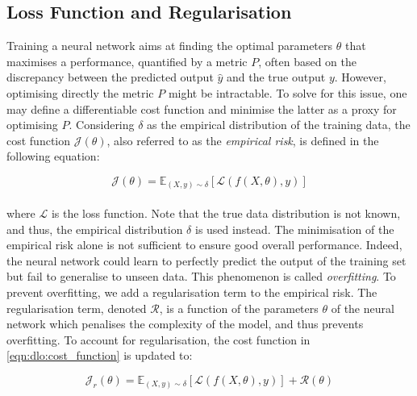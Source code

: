 
\subsection{Loss Function and Regularisation}
Training a neural network aims at finding the optimal parameters $\theta$ that
maximises a performance, quantified by a metric $P$, often based on the
discrepancy between the predicted output $\hat{y}$ and the true output $y$.
However, optimising directly the metric $P$ might be intractable. To solve for
this issue, one may define a differentiable cost function and minimise the
latter as a proxy for optimising $P$. Considering $\delta$ as the empirical
distribution of the training data, the cost function $\mathcal{J}(\theta)$, also
referred to as the \emph{empirical risk}, is defined in the following equation:

\begin{equation}
  \label{eqn:dlo:cost_function}
  \mathcal{J}(\theta) = \mathds{E}_{(X, y) \sim \delta} \left[ \mathcal{L}(f(X,\theta), y) \right]
\end{equation}\\

\noindent where $\mathcal{L}$ is the loss function. Note that the true data
distribution is not known, and thus, the empirical distribution $\delta$ is used
instead. The minimisation of the empirical risk alone is not sufficient to
ensure good overall performance. Indeed, the neural network could learn to
perfectly predict the output of the training set but fail to generalise to
unseen data. This phenomenon is called \emph{overfitting}. To prevent
overfitting, we add a regularisation term to the empirical risk. The
regularisation term, denoted $\mathcal{R}$, is a function of the parameters
$\theta$ of the neural network which penalises the complexity of the model, and
thus prevents overfitting. To account for regularisation, the cost function in
\cref{eqn:dlo:cost_function} is updated to:

\begin{equation}
  \label{eqn:dlo:regularised_cost_fn}
  \mathcal{J}_r(\theta) = \mathds{E}_{(X, y) \sim \delta} \left[ \mathcal{L}(f(X,\theta), y) \right] + \mathcal{R}(\theta) 
\end{equation}\\

